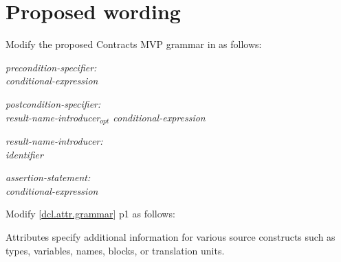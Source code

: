 \section{Proposed wording}

Modify the proposed Contracts MVP grammar in \cite{P2900R5} as follows:

\begin{adjustwidth}{0.5cm}{0.5cm}

\emph{precondition-specifier:} \\
\phantom{~~~}  \tcode{(} \emph{conditional-expression} \tcode{)}

\emph{postcondition-specifier:} \\
\phantom{~~~}  \tcode{(} \emph{result-name-introducer$_{opt}$ conditional-expression} \tcode{)}

\emph{result-name-introducer:} \\
\phantom{~~~}\emph{identifier} \tcode{:}

\emph{assertion-statement:} \\
\phantom{~~~}  \tcode{(} \emph{conditional-expression} \tcode{) ;}

\end{adjustwidth}

Modify [\href{https://eel.is/c++draft/dcl.attr.grammar#1.sentence-1}{dcl.attr.grammar}] p1 as follows:

\begin{adjustwidth}{0.5cm}{0.5cm}

Attributes specify additional information for various source constructs such as types, variables, names, blocks, or translation units.

\end{adjustwidth}





\renewcommand{\bibname}{References}




